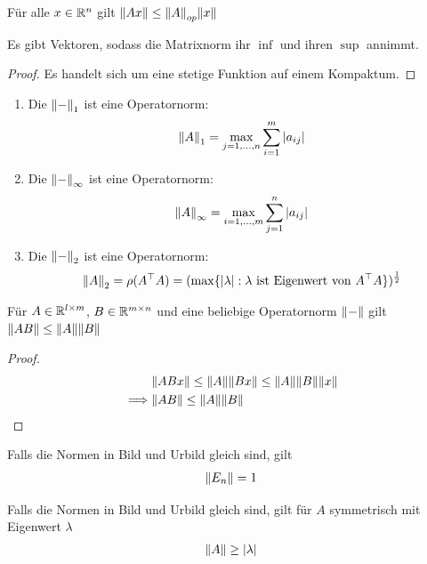 \documentclass{report}
\begin{document}
\begin{corollary}
	Für alle $x \in \mathbb{R}^n$ gilt $\norm{Ax} \leq \norm{A}_{op}\norm{x}$
\end{corollary}
\begin{lemma}
	Es gibt Vektoren, sodass die Matrixnorm ihr $\inf$ und ihren $\sup$ annimmt.
\end{lemma}
\begin{proof}
	Es handelt sich um eine stetige Funktion auf einem Kompaktum.
\end{proof}
\begin{example}
\begin{enumerate}
	\item Die  $\norm{-}_1$ ist eine Operatornorm:
	\begin{align*}
		\norm{A}_{1} = \max_{j = 1, \hdots, n} \sum_{i = 1}^m \abs{a_{ij}}
	\end{align*}
	\item Die  $\norm{-}_\infty$ ist eine Operatornorm:
	\begin{align*}
		\norm{A}_{\infty} = \max_{i = 1, \hdots, m} \sum_{j = 1}^n \abs{a_{ij}}
	\end{align*}
	\item Die  $\norm{-}_2$ ist eine Operatornorm:
	\begin{align*}
		\norm{A}_2 = \rho(A^\top A) = (\max \{\abs{\lambda} : \lambda \textnormal{ ist Eigenwert von $A^\top A$}\})^\frac{1}{2}
	\end{align*}
\end{enumerate}
\end{example}
\begin{lemma}
	Für $A \in \mathbb{R}^{l \times m}$, $B \in \mathbb{R}^{m \times n}$ und eine beliebige Operatornorm $\norm{-}$ gilt $\norm{AB} \leq \norm{A}\norm{B}$
\end{lemma}
\begin{proof}
	\begin{align*}
		&\norm{ABx} \leq \norm{A}\norm{Bx} \leq \norm{A}\norm{B}\norm{x}\\
		\implies &\norm{AB} \leq \norm{A}\norm{B}
	\end{align*}
\end{proof}
\begin{lemma}
	Falls die Normen in Bild und Urbild gleich sind, gilt
	\begin{align*}
		\norm{E_n} = 1
	\end{align*}
\end{lemma}
\begin{lemma}
	Falls die Normen in Bild und Urbild gleich sind, gilt für $A$ symmetrisch mit Eigenwert $\lambda$
	\begin{align*}
		\norm{A} \geq \abs{\lambda}
	\end{align*}
\end{lemma}
\end{document}
